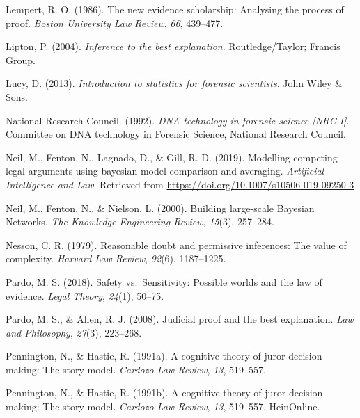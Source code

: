 \documentclass[11pt,dvipsnames,enabledeprecatedfontcommands]{scrartcl}
\begin{document}
\leavevmode\hypertarget{ref-Lempert1986}{}%
Lempert, R. O. (1986). The new evidence scholarship: Analysing the
process of proof. \emph{Boston University Law Review}, \emph{66},
439--477.

\leavevmode\hypertarget{ref-Lipton2004-LIPITT}{}%
Lipton, P. (2004). \emph{Inference to the best explanation}.
Routledge/Taylor; Francis Group.

\leavevmode\hypertarget{ref-lucy2013introduction}{}%
Lucy, D. (2013). \emph{Introduction to statistics for forensic
scientists}. John Wiley \& Sons.

\leavevmode\hypertarget{ref-NRCI1992}{}%
National Research Council. (1992). \emph{DNA technology in forensic
science \textup{{[}NRC I{]}}}. Committee on DNA technology in Forensic
Science, National Research Council.

\leavevmode\hypertarget{ref-Fenton2019Modelling}{}%
Neil, M., Fenton, N., Lagnado, D., \& Gill, R. D. (2019). Modelling
competing legal arguments using bayesian model comparison and averaging.
\emph{Artificial Intelligence and Law}. Retrieved from
\url{https://doi.org/10.1007/s10506-019-09250-3}

\leavevmode\hypertarget{ref-neil2000BuildingLargescaleBayesian}{}%
Neil, M., Fenton, N., \& Nielson, L. (2000). Building large-scale
Bayesian Networks. \emph{The Knowledge Engineering Review},
\emph{15}(3), 257--284.

\leavevmode\hypertarget{ref-Nesson1979Reasonable-doub}{}%
Nesson, C. R. (1979). Reasonable doubt and permissive inferences: The
value of complexity. \emph{Harvard Law Review}, \emph{92}(6),
1187--1225.

\leavevmode\hypertarget{ref-pardo2018}{}%
Pardo, M. S. (2018). Safety vs.~Sensitivity: Possible worlds and the law
of evidence. \emph{Legal Theory}, \emph{24}(1), 50--75.

\leavevmode\hypertarget{ref-Pardo2008judicial}{}%
Pardo, M. S., \& Allen, R. J. (2008). Judicial proof and the best
explanation. \emph{Law and Philosophy}, \emph{27}(3), 223--268.

\leavevmode\hypertarget{ref-Pennington1991}{}%
Pennington, N., \& Hastie, R. (1991a). A cognitive theory of juror
decision making: The story model. \emph{Cardozo Law Review}, \emph{13},
519--557.

\leavevmode\hypertarget{ref-pennington1991cognitive}{}%
Pennington, N., \& Hastie, R. (1991b). A cognitive theory of juror
decision making: The story model. \emph{Cardozo Law Review}, \emph{13},
519--557. HeinOnline.
\end{document}
